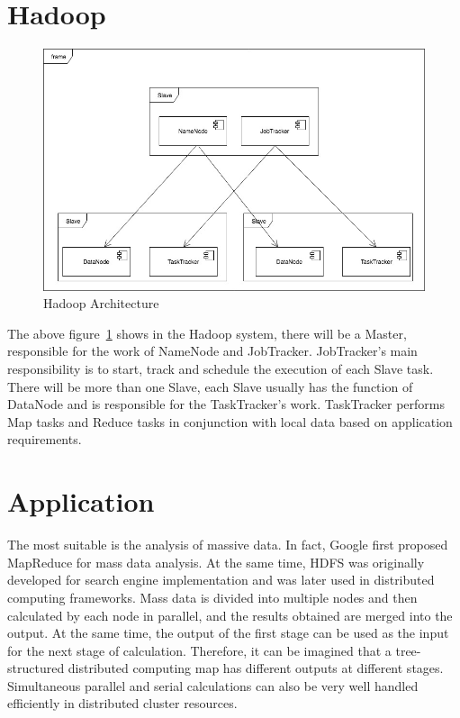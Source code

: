 \section{Hadoop}
\begin{figure}[!ht]
  \centering\includegraphics[width=\columnwidth]{images/hadoop.jpg}
  \caption{Hadoop Architecture }\label{f:hadoop}
\end{figure}


The above figure~\ref{f:hadoop} shows in the Hadoop system, there will be a Master, 
responsible for the work of NameNode and JobTracker. JobTracker's main responsibility 
is to start, track and schedule the execution of each Slave task. There will be more 
than one Slave, each Slave usually has the function of DataNode and is responsible 
for the TaskTracker's work. TaskTracker performs Map tasks and Reduce tasks in 
conjunction with local data based on application requirements.

\section{Application}
The most suitable is the analysis of massive data. In fact, Google first proposed 
MapReduce for mass data analysis. At the same time, HDFS was originally developed 
for search engine implementation and was later used in distributed computing 
frameworks. Mass data is divided into multiple nodes and then calculated by each 
node in parallel, and the results obtained are merged into the output. At the same 
time, the output of the first stage can be used as the input for the next stage 
of calculation. Therefore, it can be imagined that a tree-structured distributed 
computing map has different outputs at different stages. Simultaneous parallel 
and serial calculations can also be very well handled efficiently in distributed 
cluster resources.

